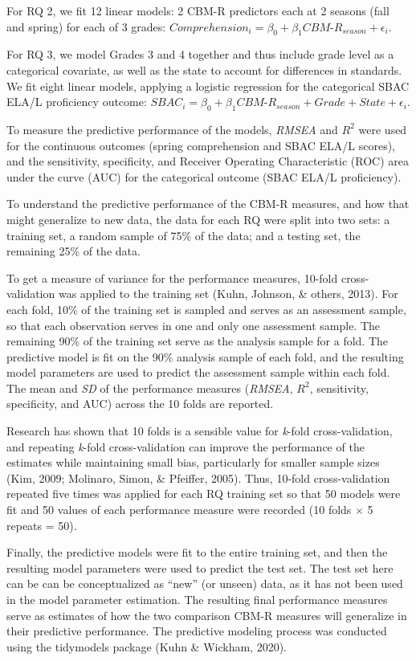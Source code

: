 \documentclass[
  english,
  man, fleqn, noextraspace]{apa6}
\begin{document}
For RQ 2, we fit 12 linear models: 2 CBM-R predictors each at 2 seasons (fall and spring) for each of 3 grades: \(Comprehension_i = \beta_0 + \beta_1CBM\mbox{-}R_{season} + \epsilon_i\).

For RQ 3, we model Grades 3 and 4 together and thus include grade level as a categorical covariate, as well as the state to account for differences in standards. We fit eight linear models, applying a logistic regression for the categorical SBAC ELA/L proficiency outcome: \(SBAC_i = \beta_0 + \beta_1CBM\mbox{-}R_{season} + Grade + State + \epsilon_i\).

To measure the predictive performance of the models, \emph{RMSEA} and \(R^2\) were used for the continuous outcomes (spring comprehension and SBAC ELA/L scores), and the sensitivity, specificity, and Receiver Operating Characteristic (ROC) area under the curve (AUC) for the categorical outcome (SBAC ELA/L proficiency).

To understand the predictive performance of the CBM-R measures, and how that might generalize to new data, the data for each RQ were split into two sets: a training set, a random sample of 75\% of the data; and a testing set, the remaining 25\% of the data.

To get a measure of variance for the performance measures, 10-fold cross-validation was applied to the training set (Kuhn, Johnson, \& others, 2013). For each fold, 10\% of the training set is sampled and serves as an assessment sample, so that each observation serves in one and only one assessment sample. The remaining 90\% of the training set serve as the analysis sample for a fold. The predictive model is fit on the 90\% analysis sample of each fold, and the resulting model parameters are used to predict the assessment sample within each fold. The mean and \emph{SD} of the performance measures (\emph{RMSEA}, \(R^2\), sensitivity, specificity, and AUC) across the 10 folds are reported.

Research has shown that 10 folds is a sensible value for \emph{k}-fold cross-validation, and repeating \emph{k}-fold cross-validation can improve the performance of the estimates while maintaining small bias, particularly for smaller sample sizes (Kim, 2009; Molinaro, Simon, \& Pfeiffer, 2005). Thus, 10-fold cross-validation repeated five times was applied for each RQ training set so that 50 models were fit and 50 values of each performance measure were recorded (10 folds \(\times\) 5 repeats = 50).

Finally, the predictive models were fit to the entire training set, and then the resulting model parameters were used to predict the test set. The test set here can be can be conceptualized as ``new'' (or unseen) data, as it has not been used in the model parameter estimation. The resulting final performance measures serve as estimates of how the two comparison CBM-R measures will generalize in their predictive performance. The predictive modeling process was conducted using the tidymodels package (Kuhn \& Wickham, 2020).
\end{document}
